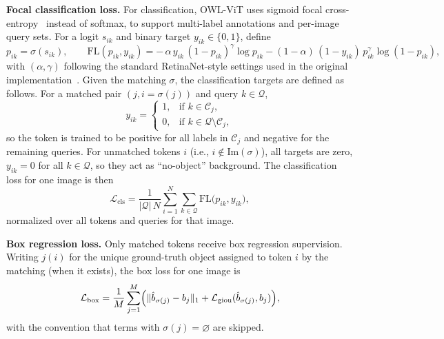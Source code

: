 \begin{enrichment}
\begin{enrichment}[Method][subsection]
		\noindent\textbf{Focal classification loss.}
		For classification, OWL-ViT uses sigmoid focal cross-entropy~\cite{lin2018_focalloss} instead of softmax, to support multi-label annotations and per-image query sets.
		For a logit $s_{ik}$ and binary target $y_{ik} \in \{0,1\}$, define
		\[
		p_{ik} = \sigma(s_{ik}),\qquad
		\mathrm{FL}(p_{ik}, y_{ik})
		= -\,\alpha\, y_{ik}\,(1-p_{ik})^\gamma \log p_{ik}
		- (1-\alpha)\,(1-y_{ik})\,p_{ik}^\gamma \log(1-p_{ik}),
		\]
		with $(\alpha,\gamma)$ following the standard RetinaNet-style settings used in the original implementation~\cite{minderer2022_owlvit}.
		Given the matching $\sigma$, the classification targets are defined as follows.
		For a matched pair $(j, i = \sigma(j))$ and query $k \in \mathcal{Q}$,
		\[
		y_{ik} =
		\begin{cases}
			1, & \text{if } k \in \mathcal{C}_j, \\
			0, & \text{if } k \in \mathcal{Q} \setminus \mathcal{C}_j,
		\end{cases}
		\]
		so the token is trained to be positive for all labels in $\mathcal{C}_j$ and negative for the remaining queries.
		For unmatched tokens $i$ (i.e., $i \notin \mathrm{Im}(\sigma)$), all targets are zero, $y_{ik} = 0$ for all $k \in \mathcal{Q}$, so they act as ``no-object'' background.
		The classification loss for one image is then
		\[
		\mathcal{L}_{\text{cls}}
		= \frac{1}{|\mathcal{Q}|\,N}
		\sum_{i=1}^{N}
		\sum_{k \in \mathcal{Q}}
		\mathrm{FL}\bigl(p_{ik}, y_{ik}\bigr),
		\]
		normalized over all tokens and queries for that image.
		
		\medskip
		\noindent\textbf{Box regression loss.}
		Only matched tokens receive box regression supervision.
		Writing $j(i)$ for the unique ground-truth object assigned to token $i$ by the matching (when it exists), the box loss for one image is
		\[
		\mathcal{L}_{\text{box}}
		= \frac{1}{M}
		\sum_{j=1}^{M}
		\Bigl(
		\|\hat{b}_{\sigma(j)} - b_j\|_1
		+ \mathcal{L}_{\text{giou}}(\hat{b}_{\sigma(j)}, b_j)
		\Bigr),
		\]
		with the convention that terms with $\sigma(j) = \varnothing$ are skipped.
		

\end{enrichment}
\end{enrichment}
